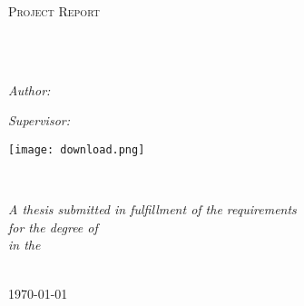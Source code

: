 \documentclass[
11pt, %
english, %
singlespacing, %
headsepline, %
]{MastersDoctoralThesis} %
\author{Hritik \textsc{Kumar}} %
\begin{document}
\frontmatter %

\pagestyle{plain} %


\begin{titlepage}
\begin{center}

\vspace*{.06\textheight}
{\scshape\LARGE \univname\par}\vspace{1.5cm} %
\textsc{\Large Project Report}\\[0.5cm] %

\HRule \\[0.4cm] %
{\huge \bfseries \ttitle\par}\vspace{0.4cm} %
\HRule \\[1.5cm] %
 
\begin{minipage}[t]{0.4\textwidth}
\begin{flushleft} \large
\emph{Author:}\\
{\authorname} %
\end{flushleft}
\end{minipage}
\begin{minipage}[t]{0.4\textwidth}
\begin{flushright} \large
\emph{Supervisor:} \\
{\supname} %
\end{flushright}
\hspace{-2.0cm}\texttt{[image: download.png]}
\end{minipage}\\[3cm]
 
\vfill

\large \textit{A thesis submitted in fulfillment of the requirements\\ for the degree of \degreename}\\[0.3cm] %
\textit{in the}\\[0.4cm]
\deptname\\[2cm] %
 
\vfill

{\large \today}\\[4cm] %
 
\vfill
\end{center}
\end{titlepage}
\end{document}
